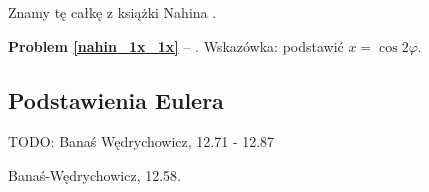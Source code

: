Znamy tę całkę z książki Nahina \cite{nahin15}.

\textbf{Problem \ref{nahin_1x_1x}} -- \cite[s. 115, 378]{nahin15}.
Wskazówka: podstawić $x = \cos 2 \varphi$.

\subsection{Podstawienia Eulera}

TODO: Banaś Wędrychowicz, 12.71 - 12.87

\begin{problem}
    Banaś-Wędrychowicz, 12.58.
\end{problem}

%